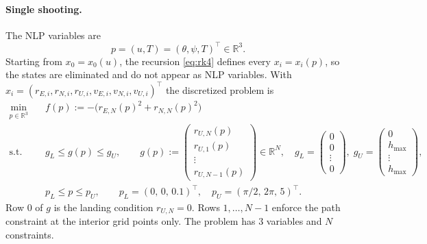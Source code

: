 \documentclass[11pt]{article}
\newcommand{\R}{\mathbb{R}}
\begin{document}
\paragraph{Single shooting.} The NLP variables are
\[
  p = (u, T) = (\theta, \psi, T)^\top \in \R^3 .
\]
Starting from $x_0 = x_0(u)$, the recursion \eqref{eq:rk4} defines every
$x_i = x_i(p)$, so the states are eliminated and do not appear as NLP variables. With
$x_i = (r_{E,i}, r_{N,i}, r_{U,i}, v_{E,i}, v_{N,i}, v_{U,i})^\top$ the discretized problem is
\begin{equation}
\begin{aligned}
  \min_{p\in\R^3}\quad & f(p) := -\bigl(r_{E,N}(p)^2 + r_{N,N}(p)^2\bigr)\\
  \text{s.t.}\quad & g_L \le g(p) \le g_U, \qquad
  g(p) := \begin{pmatrix} r_{U,N}(p)\\ r_{U,1}(p)\\ \vdots\\ r_{U,N-1}(p)\end{pmatrix}\in\R^N,\quad
  g_L = \begin{pmatrix}0\\0\\ \vdots\\ 0\end{pmatrix},\;
  g_U = \begin{pmatrix}0\\h_{\max}\\ \vdots\\ h_{\max}\end{pmatrix},\\
  & p_L \le p \le p_U,\qquad p_L = (0,\,0,\,0.1)^\top,\quad p_U = (\pi/2,\,2\pi,\,5)^\top .
\end{aligned}
\tag{nlp}\label{eq:nlp}
\end{equation}
Row $0$ of $g$ is the landing condition $r_{U,N}=0$. Rows $1,\dots,N-1$ enforce the path
constraint at the interior grid points only. The problem has $3$ variables and $N$ constraints.
\end{document}
